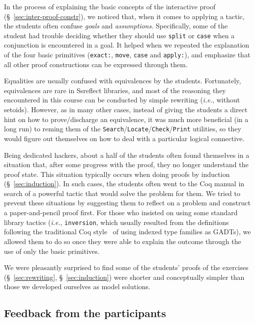 \documentclass[blockstyle,preprint,nocopyrightspace]{sigplanconf}
\newcommand{\an}[1]{\textcolor{red}{(Aleks: {#1})}}
\newcommand{\code}[1]{\lstinline{#1}}
\newcommand{\ie}{\emph{i.e.}\xspace}
\begin{document}
In the process of explaining the basic concepts of the interactive
proof (\S~\ref{sec:inter-proof-constr}), we noticed that, when it
comes to applying a tactic, the students often confuse \emph{goals}
and \emph{assumptions}. Specifically, some of the student had trouble
deciding whether they should use \code{split} or \code{case} when a
conjunction is encountered in a goal. It helped when we repeated the
explanation of the four basic primitives (\code{exact:}, \code{move},
\code{case} and \code{apply:}), and emphasize that all other proof
constructions can be expressed through them.

Equalities are usually confused with equivalences by the
students. Fortunately, equivalences are rare in Ssreflect libraries,
and most of the reasoning they encountered in this course can be
conducted by simple rewriting (\ie, without setoids). However, as in
many other cases, instead of giving the students a direct hint on how
to prove/discharge an equivalence, it was much more beneficial (in a
long run) to reming them of the
\code{Search}/\code{Locate}/\code{Check}/\code{Print} utilities, so
they would figure out themselves on how to deal with a particular
logical connective.
%

Being dedicated hackers, about a half of the students often found
themselves in a situation that, after some progress with the proof,
they no longer understand the proof state. This situation typically
occurs when doing proofs by induction (\S~\ref{sec:induction}). In
such cases, the students often went to the Coq manual in search of a
powerful tactic that would solve the problem for them. We tried to
prevent these situations by suggesting them to reflect on a problem
and construct a paper-and-pencil proof first. For those who insisted
on using some standard library tactics (\ie, \code{inversion}, which
usually resulted from the definitions following the traditional Coq
style~\cite{Chlipala:BOOK,Pierce-al:SF} of using indexed type families
as GADTs), we allowed them to do so once they were able to explain the
outcome through the use of only the basic primitives.

We were pleasantly surprised to find some of the students' proofs of
the exercises (\S~\ref{sec:rewriting}, \S~\ref{sec:induction}) were
shorter and conceptually simpler than those we developed ourselves as
model solutions.

\subsection{Feedback from the participants}
\label{sec:feedback}
\end{document}
